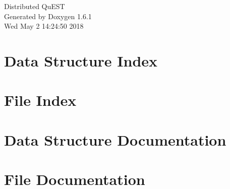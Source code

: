 \documentclass[a4paper]{article}
\begin{document}
\hypersetup{pageanchor=false}
\begin{titlepage}
\vspace*{7cm}
\begin{center}
{\Large Distributed QuEST }\\
\vspace*{1cm}
{\large Generated by Doxygen 1.6.1}\\
\vspace*{0.5cm}
{\small Wed May 2 14:24:50 2018}\\
\end{center}
\end{titlepage}
\tableofcontents
{}
\hypersetup{pageanchor=true}
\section{Data Structure Index}

\section{File Index}

\section{Data Structure Documentation}






\section{File Documentation}














\printindex
\end{document}
